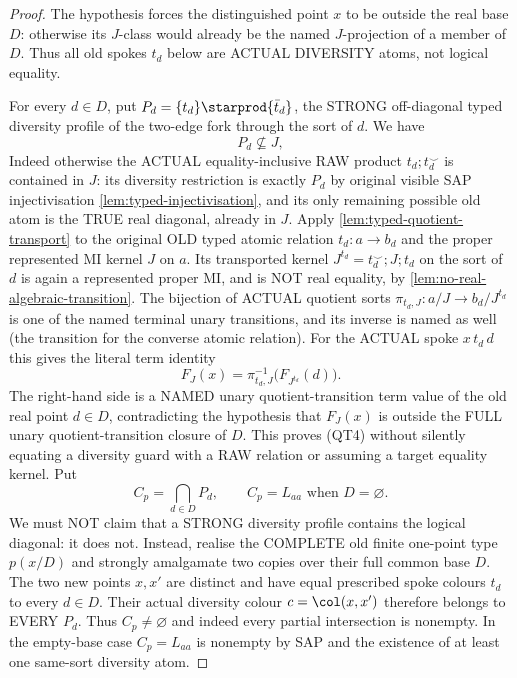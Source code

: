 \begin{proof}
The hypothesis forces the distinguished point $x$
to be outside the real base $D$: otherwise its
$J$-class would already be the named $J$-projection
of a member of $D$. Thus all old spokes $t_d$
below are ACTUAL DIVERSITY atoms, not logical equality.

For every \(d\in D\), put
\(P_d=\{t_d\}\starprod\{\bar t_d\}\), the
STRONG off-diagonal typed diversity profile of
the two-edge fork through the sort of \(d\). We have
\[
 P_d\not\subseteq J,
\tag{QT4}\label{eq:typed-unforced-spoke}
\]
Indeed otherwise the ACTUAL equality-inclusive RAW
product $t_d;t_d^{\smile}$ is contained in $J$:
its diversity restriction is exactly $P_d$
by original visible SAP injectivisation
\cref{lem:typed-injectivisation},
and its only remaining possible old atom is
the TRUE real diagonal, already in $J$.
Apply \cref{lem:typed-quotient-transport}
to the original OLD typed atomic relation
$t_d:a\to b_d$ and the proper represented
MI kernel $J$ on $a$. Its transported
kernel $J^{t_d}=t_d^{\smile};J;t_d$
on the sort of $d$ is again a represented
proper MI, and is NOT real equality, by
\cref{lem:no-real-algebraic-transition}.
The bijection of ACTUAL quotient sorts
$\pi_{t_d,J}:a/J\to b_d/J^{t_d}$
is one of the named terminal unary transitions,
and its inverse is named as well (the
transition for the converse atomic relation).
For the ACTUAL spoke $x\,t_d\,d$ this gives
the literal term identity
\[
 F_J(x)
   =\pi_{t_d,J}^{-1}
                \bigl(F_{J^{t_d}}(d)\bigr).
\]
The right-hand side is a NAMED unary
quotient-transition term value of the
old real point $d\in D$, contradicting
the hypothesis that $F_J(x)$ is outside
the FULL unary quotient-transition closure of $D$.
This proves (QT4) without silently
equating a diversity guard with a RAW
relation or assuming a target equality kernel.  Put
\[
 C_p=\bigcap_{d\in D}P_d,\qquad
 C_p=L_{aa}\text{ when }D=\varnothing.
\]
We must NOT claim that a STRONG diversity profile contains
the logical diagonal: it does not. Instead, realise the
COMPLETE old finite one-point type \(p(x/D)\) and
strongly amalgamate two copies over their full common
base \(D\). The two new points \(x,x'\) are distinct
and have equal prescribed spoke colours \(t_d\) to
every \(d\in D\). Their actual diversity colour
\(c=\col(x,x')\) therefore belongs to EVERY \(P_d\).
Thus \(C_p\ne\varnothing\) and indeed every
partial intersection is nonempty. In the empty-base
case \(C_p=L_{aa}\) is nonempty by SAP and
the existence of at least one same-sort diversity
atom.


\end{proof}

